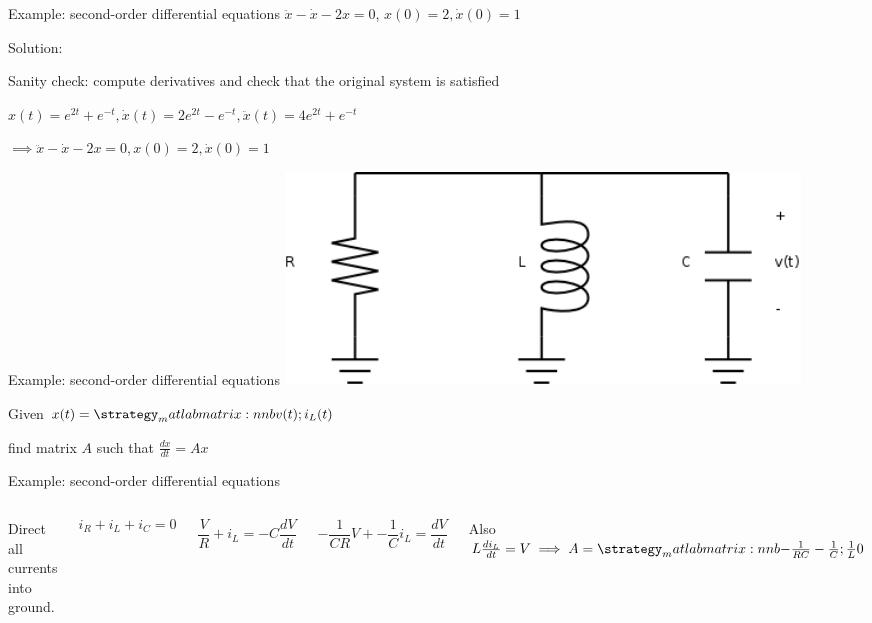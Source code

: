 	\begin{frame}{Example: second-order differential equations}
	    $\ddot{x} - \dot{x} - 2x = 0$, $x(0) = 2, \dot{x}(0) = 1$
	    
	    Solution:
	    
	    Sanity check: compute derivatives and check that the original system is satisfied
	    
	    $x(t) = e^{2t} + e^{-t}, \dot{x}(t) = 2e^{2t} - e^{-t}, \ddot{x}(t) = 4e^{2t} + e^{-t}$
	    
	    $\implies \ddot{x} - \dot{x} - 2x = 0, x(0) = 2, \dot{x}(0) = 1$
	\end{frame}
	
	\begin{frame}{Example: second-order differential equations}
	    \includegraphics[width=0.6\textwidth]{./images/second-order-1.png}
	    
	    Given $x(t) = \mat{v(t);i_L(t)}$
	    
	    find matrix $A$ such that $\frac{dx}{dt} = Ax$
	\end{frame}
	
	\begin{frame}{Example: second-order differential equations}
    	\begin{columns}[onlytextwidth,T]
        	\column{\dimexpr\linewidth-40mm-5mm}
        	Direct all currents into ground.
	        
	        $$i_R + i_L + i_C = 0$$
	        
	        $$\frac{V}{R} + i_L = -C\frac{dV}{dt}$$
	        
	        $$-\frac{1}{CR}V + -\frac{1}{C}i_L = \frac{dV}{dt}$$
	        
	        Also $L\frac{di_L}{dt} = V \implies A = \mat{-\frac{1}{RC} -\frac{1}{C}; \frac{1}{L} 0}$
	        
	        \column{40mm}
	        \includegraphics[width=40mm]{./images/second-order-1.png}
        \end{columns}
	\end{frame}
	
